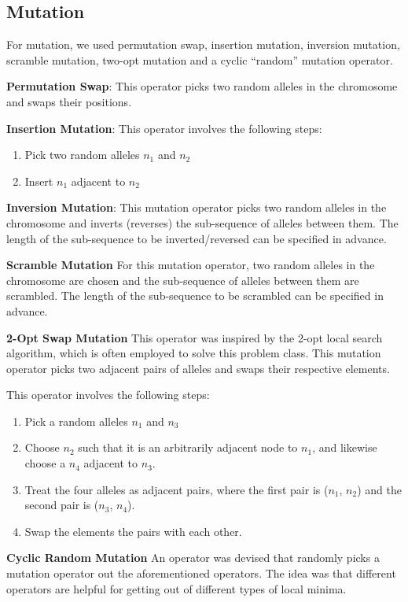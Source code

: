 \documentclass[12pt,twocolumn,oneside]{osajnl}
\begin{document}
\subsection{Mutation}
For mutation, we used permutation swap, insertion mutation, inversion mutation, scramble mutation, two-opt mutation and a cyclic “random” mutation operator.

\textbf{Permutation Swap}: This operator picks two random alleles in the chromosome and swaps their positions.

\textbf{Insertion Mutation}: This operator involves the following steps:
\begin{enumerate}
    \item Pick two random alleles $n_1$ and $n_2$
    \item Insert $n_1$ adjacent to $n_2$
\end{enumerate}

\textbf{Inversion Mutation}: This mutation operator picks two random alleles in the chromosome and inverts (reverses) the sub-sequence of alleles between them. The length of the sub-sequence to be inverted/reversed can be specified in advance.

\textbf{Scramble Mutation}
For this mutation operator, two random alleles in the chromosome are chosen and the sub-sequence of alleles between them are scrambled. The length of the sub-sequence to be scrambled can be specified in advance.

\textbf{2-Opt Swap Mutation}
This operator was inspired by the 2-opt local search algorithm, which is often employed to solve this problem class.  This mutation operator picks two adjacent pairs of alleles and swaps their respective elements\cite{croes1958method}.

This operator involves the following steps:

\begin{enumerate}
    \item Pick a random alleles $n_1$ and $n_3$
    \item Choose $n_2$ such that it is an arbitrarily adjacent node to $n_1$, and likewise choose a $n_4$ adjacent to $n_3$.
    \item Treat the four alleles as adjacent pairs, where the first pair is ($n_1$, $n_2$) and the second pair is ($n_3$, $n_4$).
    \item Swap the elements the pairs with each other.
\end{enumerate}


\textbf{Cyclic Random Mutation}
An operator was devised that randomly picks a mutation operator out the aforementioned operators. The idea was that different operators are helpful for getting out of different types of local minima.
\end{document}
